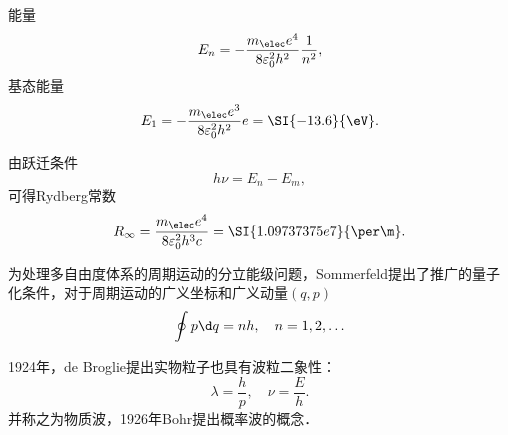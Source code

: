 能量
\begin{align}
	E_n=-\frac{m_\elec e^4}{8\varepsilon_0^2h^2}\frac1{n^2},
\end{align}
基态能量
\[
E_1=-\frac{m_\elec e^3}{8\varepsilon_0^2h^2}e=\SI{-13.6}{\eV}.
\]

由跃迁条件
\[
h\nu=E_n-E_m,
\]
可得Rydberg常数
\[
R_\infty=\frac{m_\elec e^4}{8\varepsilon_0^2h^3c}=\SI{1.09737375e7}{\per\m}.
\]

为处理多自由度体系的周期运动的分立能级问题，Sommerfeld提出了推广的量子化条件，对于周期运动的广义坐标和广义动量$(q,p)$
\begin{align}
	\oint p\d q=nh,\quad n=1,2,\ldots
\end{align}

1924年，de Broglie提出实物粒子也具有波粒二象性：
\[
	\lambda=\frac hp,\quad\nu=\frac Eh.
\]
并称之为物质波，1926年Bohr提出概率波的概念．